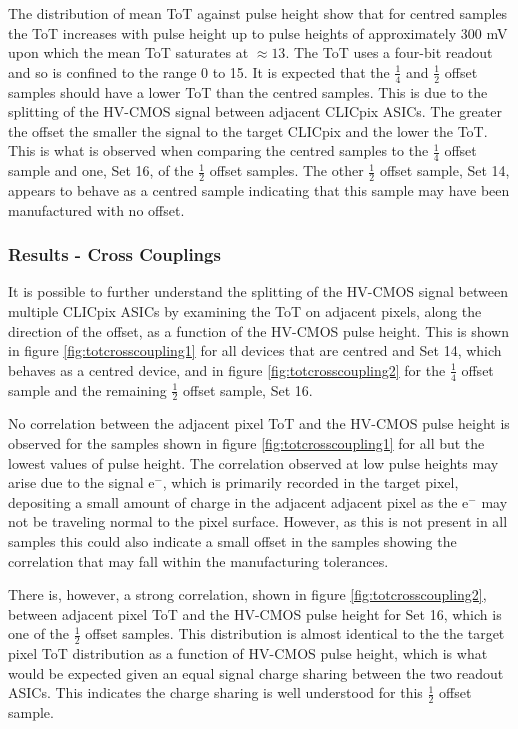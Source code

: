 The distribution of mean ToT against pulse height show that for centred samples the ToT increases with pulse height up to pulse heights of approximately 300 mV upon which the mean ToT saturates at $\approx 13$.  The ToT uses a four-bit readout and so is confined to the range 0 to 15.  It is expected that the $\frac{1}{4}$ and $\frac{1}{2}$ offset samples should have a lower ToT than the centred samples.  This is due to the splitting of the HV-CMOS signal between adjacent CLICpix ASICs.  The greater the offset the smaller the signal to the target CLICpix and the lower the ToT.  This is what is observed when comparing the centred samples to the $\frac{1}{4}$ offset sample and one, Set 16, of the $\frac{1}{2}$ offset samples.  The other $\frac{1}{2}$ offset sample, Set 14, appears to behave as a centred sample indicating that this sample may have been manufactured with no offset.  


\subsubsection{Results -  Cross Couplings}
It is possible to further understand the splitting of the HV-CMOS signal between multiple CLICpix ASICs by examining the ToT on adjacent pixels, along the direction of the offset, as a function of the HV-CMOS pulse height.  This is shown in figure \ref{fig:totcrosscoupling1} for all devices that are centred and Set 14, which behaves as a centred device, and in figure \ref{fig:totcrosscoupling2} for the $\frac{1}{4}$ offset sample and the remaining $\frac{1}{2}$ offset sample, Set 16.  

No correlation between the adjacent pixel ToT and the HV-CMOS pulse height is observed for the samples shown in figure \ref{fig:totcrosscoupling1} for all but the lowest values of pulse height.  The correlation observed at low pulse heights may arise due to the signal $\text{e}^{-}$, which is primarily recorded in the target pixel, depositing a small amount of charge in the adjacent adjacent pixel as the $\text{e}^{-}$ may not be traveling normal to the pixel surface.  However, as this is not present in all samples this could also indicate a small offset in the samples showing the correlation that may fall within the manufacturing tolerances.  

There is, however, a strong correlation, shown in figure \ref{fig:totcrosscoupling2}, between adjacent pixel ToT and the HV-CMOS pulse height for Set 16, which is one of the $\frac{1}{2}$ offset samples.  This distribution is almost identical to the the target pixel ToT distribution as a function of HV-CMOS pulse height, which is what would be expected given an equal signal charge sharing between the two readout ASICs.  This indicates the charge sharing is well understood for this $\frac{1}{2}$ offset sample.   

